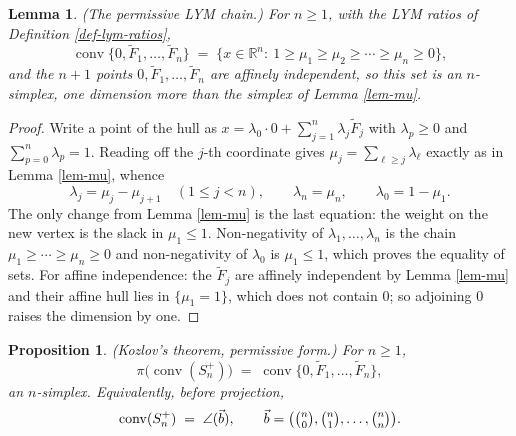 \documentclass[11pt, a4paper, abstract=yes]{scrartcl}
\theoremstyle{definition}
\theoremstyle{remark}
\theoremstyle{plain}
\newtheorem{lemma}[definition]{Lemma}
\newtheorem{proposition}[definition]{Proposition}
\newcommand{\rasimp}{\angle}
\newcommand{\proj}{\pi}
\newcommand{\conv}{\operatorname{conv}}
\begin{document}
\begin{lemma}
(\emph{The permissive LYM chain.}) For \(n\ge1\), with the LYM ratios of Definition \ref{def-lym-ratios},
\begin{equation}\label{eq:mu-permissive}
  \conv\lbrace0,\tilde F_1,\dots,\tilde F_n\rbrace
  \;=\;\lbrace x\in\mathbb R^n:\ 1\ge\mu_1\ge\mu_2\ge\cdots\ge\mu_n\ge0\rbrace ,
\end{equation}
and the \(n+1\) points \(0,\tilde F_1,\dots,\tilde F_n\) are affinely independent, so this set is an
\(n\)-simplex, one dimension more than the simplex of Lemma \ref{lem-mu}.
\label{lem:mu-permissive}
\label{lem-mu-permissive}
\end{lemma}

\begin{proof}
Write a point of the hull as \(x=\lambda_0\cdot0+\sum_{j=1}^n\lambda_j\tilde F_j\) with
\(\lambda_p\ge0\) and \(\sum_{p=0}^n\lambda_p=1\). Reading off the \(j\)-th coordinate gives
\(\mu_j=\sum_{\ell\ge j}\lambda_\ell\) exactly as in Lemma \ref{lem-mu}, whence
\begin{equation}\label{eq:mu-permissive-2}
  \lambda_j=\mu_j-\mu_{j+1}\quad(1\le j<n),\qquad \lambda_n=\mu_n,\qquad
  \lambda_0=1-\mu_1 .
\end{equation}
The only change from Lemma \ref{lem-mu} is the last equation: the weight on the new vertex is the slack
in \(\mu_1\le1\). Non-negativity of \(\lambda_1,\dots,\lambda_n\) is the chain
\(\mu_1\ge\cdots\ge\mu_n\ge0\) and non-negativity of \(\lambda_0\) is \(\mu_1\le1\), which proves the
equality of sets. For affine independence: the \(\tilde F_j\) are affinely independent by
Lemma \ref{lem-mu} and their affine hull lies in \(\lbrace\mu_1=1\rbrace\), which does not contain
\(0\); so adjoining \(0\) raises the dimension by one.
\end{proof}

\begin{proposition}
(\emph{Kozlov's theorem, permissive form.}) For \(n\ge1\),
\begin{equation}\label{eq:permissive-hull}
  \proj\bigl(\conv(S_n^{+})\bigr)\;=\;\conv\lbrace0,\tilde F_1,\dots,\tilde F_n\rbrace ,
\end{equation}
an \(n\)-simplex. Equivalently, before projection,
\begin{equation}\label{eq:permissive-hull-incl}
  \conv(S_n^{+})\;=\;\rasimp(\vec b),\qquad
  \vec b=\bigl(\tbinom n0,\tbinom n1,\dots,\tbinom nn\bigr).
\end{equation}
\label{prop:permissive-hull}
\label{prop-permissive-hull}
\end{proposition}
\end{document}
